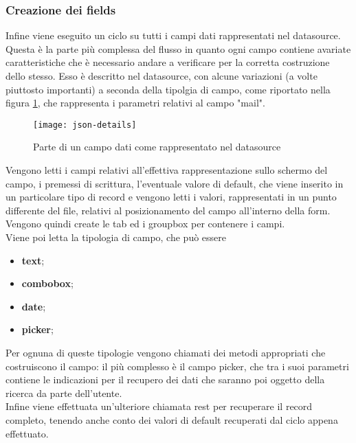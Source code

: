 \subsubsection{Creazione dei fields}
Infine viene eseguito un ciclo su tutti i campi dati rappresentati nel datasource. Questa è la parte più complessa del flusso in quanto ogni campo contiene avariate caratteristiche che è necessario andare a verificare per la corretta costruzione dello stesso. Esso è descritto nel datasource, con alcune variazioni (a volte piuttosto importanti) a seconda della tipolgia di campo, come riportato nella figura \ref{fig:json-detail}, che rappresenta i parametri relativi al campo "mail".\\  
	\begin{figure}[h]
		\centering
		\texttt{[image: json-details]}
		\caption{Parte di un campo dati come rappresentato nel datasource}
		\label{fig:json-detail}
	\end{figure}
Vengono letti i campi relativi all'effettiva rappresentazione sullo schermo del campo, i premessi di scrittura, l'eventuale valore di default, che viene inserito in un particolare tipo di \gls{record} e vengono letti i valori, rappresentati in un punto differente del file, relativi al posizionamento del campo all'interno della form.\\
Vengono quindi create le tab ed i groupbox per contenere i campi.\\
Viene poi letta la tipologia di campo, che può essere
\begin{itemize}
	\item \textbf{text};
	\item \textbf{combobox};
	\item \textbf{date};
	\item \textbf{picker};
\end{itemize}
Per ognuna di queste tipologie vengono chiamati dei metodi appropriati che costruiscono il campo: il più complesso è il campo picker, che tra i suoi parametri contiene le indicazioni per il recupero dei dati che saranno poi oggetto della ricerca da parte dell'utente.\\
Infine viene effettuata un'ulteriore chiamata rest per recuperare il record completo, tenendo anche conto dei valori di default recuperati dal ciclo appena effettuato.

\newpage